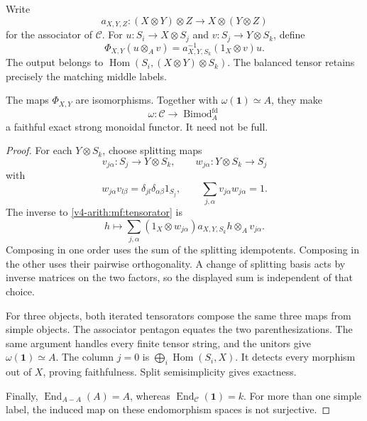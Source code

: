 Write
\[
 a_{X,Y,Z}:(X\otimes Y)\otimes Z\longrightarrow
                   X\otimes(Y\otimes Z)
\]
for the associator of \(\mathcal C\).
For \(u:S_i\to X\otimes S_j\) and
\(v:S_j\to Y\otimes S_k\), define
\begin{equation}\label{v4-arith:mf:tensorator}
 \Phi_{X,Y}(u\otimes_Av)
       =a^{-1}_{X,Y,S_k}(1_X\otimes v)u.
\end{equation}
The output belongs to
\(\operatorname{Hom}(S_i,(X\otimes Y)\otimes S_k)\).
The balanced tensor retains precisely the matching middle labels.

\begin{theorem}\label{v4-arith:mf:finite-functor}
The maps \(\Phi_{X,Y}\) are isomorphisms.
Together with \(\omega(\mathbf1)\simeq A\), they make
\[
 \omega:\mathcal C\longrightarrow\operatorname{Bimod}^{\mathrm{fd}}_A
\]
a faithful exact strong monoidal functor.
It need not be full.
\end{theorem}

\begin{proof}
For each \(Y\otimes S_k\), choose splitting maps
\[
 v_{j\alpha}:S_j\longrightarrow Y\otimes S_k,\qquad
 w_{j\alpha}:Y\otimes S_k\longrightarrow S_j
\]
with
\[
 w_{j\alpha}v_{l\beta}
       =\delta_{jl}\delta_{\alpha\beta}1_{S_j},
 \qquad \sum_{j,\alpha}v_{j\alpha}w_{j\alpha}=1.
\]
The inverse to \eqref{v4-arith:mf:tensorator} is
\begin{equation}\label{v4-arith:mf:tensorator-inverse}
 h\longmapsto
 \sum_{j,\alpha}
 (1_X\otimes w_{j\alpha})a_{X,Y,S_k}h\otimes_Av_{j\alpha}.
\end{equation}
Composing in one order uses the sum of the splitting idempotents.
Composing in the other uses their pairwise orthogonality.
A change of splitting basis acts by inverse matrices on the two
factors, so the displayed sum is independent of that choice.

For three objects, both iterated tensorators compose the same
three maps from simple objects.
The associator pentagon equates the two parenthesizations.
The same argument handles every finite tensor string, and the
unitors give \(\omega(\mathbf1)\simeq A\).
The column \(j=0\) is
\(\bigoplus_i\operatorname{Hom}(S_i,X)\).
It detects every morphism out of \(X\), proving faithfulness.
Split semisimplicity gives exactness.

Finally, \(\operatorname{End}_{A-A}(A)=A\),
whereas \(\operatorname{End}_{\mathcal C}(\mathbf1)=k\).
For more than one simple label, the induced map on these endomorphism
spaces is not surjective.
\end{proof}

